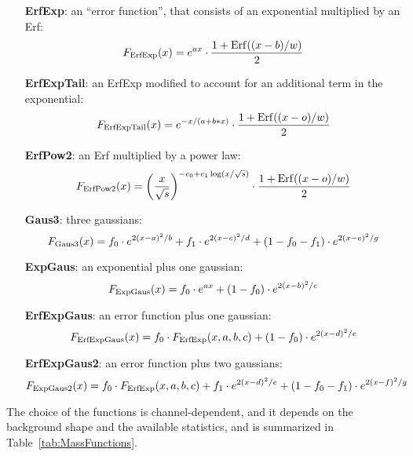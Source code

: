 \begin{itemize}
  \item[{\bf ErfExp}:] an ``error function'', that consists of an exponential multiplied by an Erf: $$F_{\rm ErfExp}(x)=e^{ax} \cdot \frac{1 + {\rm Erf}((x-b)/w)}{2}$$
  \item[{\bf ErfExpTail}:] an ErfExp modified to account for an additional term in the exponential: $$F_{\rm ErfExpTail}(x)=e^{-x/(a+b*x)} \cdot \frac{1 + {\rm Erf}((x-o)/w)}{2}$$
  \item[{\bf ErfPow2}:] an Erf multiplied by a power law: $$F_{\rm ErfPow2}(x)={ \left( \frac{x}{\sqrt{s}} \right)}^{- c_0 + c_1 \log(x/\sqrt{s})} \cdot \frac{1 + {\rm Erf}((x-o)/w)}{2}$$
  \item[{\bf Gaus3}:] three gaussians: $$F_{\rm Gaus3}(x) = f_0 \cdot e^{2(x-a)^2/b} +f_1 \cdot e^{2(x-c)^2/d} + (1-f_0-f_1) \cdot e^{2(x-e)^2/g}$$
  \item[{\bf ExpGaus}:] an exponential plus one gaussian: $$F_{\rm ExpGaus}(x) = f_0 \cdot e^{ax} + (1-f_0) \cdot e^{2(x-b)^2/c}$$
  \item[{\bf ErfExpGaus}:] an error function plus one gaussian: $$F_{\rm ErfExpGaus}(x) = f_0 \cdot F_{\rm ErfExp}(x,a,b,c) + (1-f_0) \cdot e^{2(x-d)^2/e}$$
  \item[{\bf ErfExpGaus2}:] an error function plus two gaussians: $$F_{\rm ExpGaus2}(x) = f_0 \cdot F_{\rm ErfExp}(x,a,b,c) + f_1 \cdot e^{2(x-d)^2/e} + (1-f_0-f_1) \cdot e^{2(x-f)^2/g}$$
\end{itemize}

The choice of the functions is channel-dependent, and it depends on the background shape and the available statistics, and is summarized in Table~\ref{tab:MassFunctions}.

